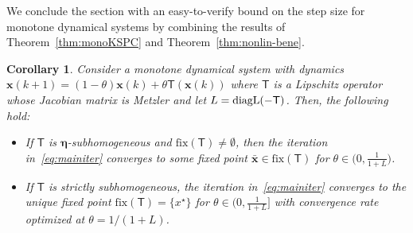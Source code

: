 \documentclass[journal,twoside,web]{ieeecolor}
\newcommand{\xb}{\boldsymbol{x}}
\newcommand{\etab}{\boldsymbol{\eta}}
\newcommand{\Fs}{\mathsf{F}}
\newcommand{\Ts}{\mathsf{T}}
\newcommand{\Is}{\mathsf{Id}}
\newcommand{\fix}{\mathrm{fix}}
\newtheorem{cor}{Corollary}
\begin{document}

%

We conclude the section with an easy-to-verify bound on the step size for monotone dynamical systems by combining the results of Theorem~\ref{thm:monoKSPC} and Theorem~\ref{thm:nonlin-bene}.
%
\begin{cor}\label{cor:nonlin-bene-mono}
    Consider a monotone dynamical system with dynamics
    $\xb(k+1) = (1-\theta)\xb(k)+\theta \Ts(\xb(k))$ where $\Ts$ is a Lipschitz operator whose Jacobian matrix is Metzler and let ${L=\normalfont{\text{diagL}(-\Ts)}}$.
    Then, the following hold:
    \begin{itemize}
        \item If $\Ts$ is $\etab$-subhomogeneous and ${\fix(\Ts)\neq \emptyset}$, then the iteration in~\eqref{eq:mainiter} converges to some fixed point $\bar{\xb}\in \fix (\Ts)$ for ${\theta\in\big(0,\frac{1}{1+L}\big)}$.
        \item If $\Ts$ is strictly subhomogeneous, the iteration in~\eqref{eq:mainiter} converges to the unique fixed point $\fix(\Ts)=\{x^\star\}$ for ${\theta\in\big(0,\frac{1}{1+L}\big]}$ with convergence rate optimized at ${\theta=1/(1+L)}$.
    \end{itemize}
\end{cor}
%
\end{document}
